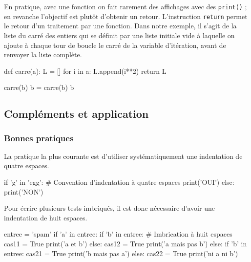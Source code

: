 \vspace{1pt}


En pratique, avec une fonction on fait rarement des affichages avec des \texttt{print()} ; en revanche l'objectif est plutôt d'obtenir un retour. L'instruction \texttt{return} permet le retour d'un traitement par une fonction. Dans notre exemple, il s'agit de la liste du carré des entiers qui se définit par une liste initiale vide à laquelle on ajoute à chaque tour de boucle le carré de la variable d'itération, avant de renvoyer la liste complète.

\begin{idleconsole}
\begin{pyconsole}
def carre(a):
    L = []
    for i in a:
        L.append(i**2)
    return L

carre(b)
b = carre(b)
b
\end{pyconsole}
\end{idleconsole}


\subsection[Compléments et application]{Compléments et application}
\label{sub:XI.3.3}


\subsubsection[Bonnes pratiques]{Bonnes pratiques}
\label{subsub:XI.3.3.1}


La pratique la plus courante est d'utiliser systématiquement une indentation de quatre espaces.

\begin{idleconsole}
\begin{pyconsole}
if 'g' in 'egg': # Convention d'indentation à quatre espaces
    print('OUI')
else:
    print('NON')

\end{pyconsole}
\end{idleconsole}

Pour écrire plusieurs tests imbriqués, il est donc nécessaire d'avoir une indentation de huit espaces.

\begin{idleconsole}
\begin{pyconsole}
entree = 'spam'
if 'a' in entree:
    if 'b' in entree: # Imbrication à huit espaces
        cas11 = True
        print('a et b')
    else:
        cas12 = True
        print('a mais pas b')
else:
    if 'b' in entree:
        cas21 = True
        print('b mais pas a')
    else:
        cas22 = True
        print('ni a ni b')

\end{pyconsole}
\end{idleconsole}

